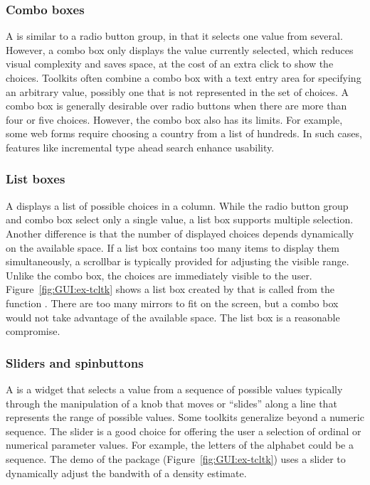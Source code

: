 \subsubsection{Combo boxes}
\label{sec:GUI:combo-boxes}

A  is similar to a radio button group, in that it
selects one value from several. However, a combo box only displays the
value currently selected, which reduces visual complexity and saves
space, at the cost of an extra click to show the choices. Toolkits
often combine a combo box with a text entry area for specifying an
arbitrary value, possibly one that is not represented in the set of
choices. A combo box is generally desirable over radio buttons when
there are more than four or five choices. However, the combo box also
has its limits. For example, some web forms require choosing a country
from a list of hundreds. In such cases, features like incremental type
ahead search enhance usability.

\subsubsection{List boxes}

A  displays a list of possible choices in a column.
While the radio button group and combo box select only a single value,
a list box supports multiple selection. Another difference is that the
number of displayed choices depends dynamically on the available
space. If a list box contains too many items to display them
simultaneously, a scrollbar is typically provided for adjusting the
visible range. Unlike the combo box, the choices are immediately visible
to the user.  Figure~\ref{fig:GUI:ex-tcltk} shows a list
box created by \R\/ that is called from the function
. There are too many mirrors to fit on the
screen, but a combo box would not take advantage of the available
space. The list box is a reasonable compromise.

\subsubsection{Sliders and spinbuttons}
\label{sec:GUI:sliders}

A  is a widget that selects a value from a sequence of
possible values typically through the manipulation of a knob that
moves or ``slides'' along a line that represents the range of possible
values. 
Some toolkits generalize beyond a numeric
sequence. The slider is a good choice for offering the user a
selection of ordinal or numerical parameter values. For example, the
letters of the alphabet could be a sequence. The  demo
of the  package (Figure~\ref{fig:GUI:ex-tcltk}) uses a
slider to dynamically adjust the bandwith of a density estimate.

